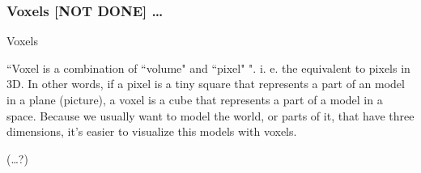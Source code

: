 
 \subsubsection{Voxels [NOT DONE] \dots} %
 \label{ssub:voxels}
 Voxels

``Voxel is a combination of ``volume" and ``pixel" ". i. e. the equivalent to pixels in 3D. In other words, if a pixel is a tiny square that represents a part of an model in a plane (picture), a voxel is a cube that represents a part of a model in a space.
Because we usually want to model the world, or parts of it, that have three dimensions, it's easier to visualize this models with voxels.

(\dots?)
